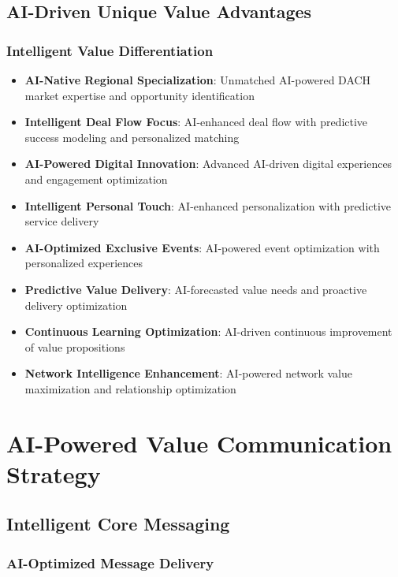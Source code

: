 \subsection{AI-Driven Unique Value Advantages}

\subsubsection{Intelligent Value Differentiation}

\begin{itemize}
    \item \textbf{AI-Native Regional Specialization}: Unmatched AI-powered DACH market expertise and opportunity identification
    \item \textbf{Intelligent Deal Flow Focus}: AI-enhanced deal flow with predictive success modeling and personalized matching
    \item \textbf{AI-Powered Digital Innovation}: Advanced AI-driven digital experiences and engagement optimization
    \item \textbf{Intelligent Personal Touch}: AI-enhanced personalization with predictive service delivery
    \item \textbf{AI-Optimized Exclusive Events}: AI-powered event optimization with personalized experiences
    \item \textbf{Predictive Value Delivery}: AI-forecasted value needs and proactive delivery optimization
    \item \textbf{Continuous Learning Optimization}: AI-driven continuous improvement of value propositions
    \item \textbf{Network Intelligence Enhancement}: AI-powered network value maximization and relationship optimization
\end{itemize}

\section{AI-Powered Value Communication Strategy}

\subsection{Intelligent Core Messaging}

\subsubsection{AI-Optimized Message Delivery}

